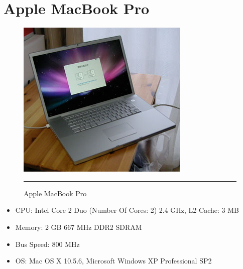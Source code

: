 \chapter{Apple MacBook Pro}
\label{AppendixB}

\begin{figure}[htbp]
  \centering
    \includegraphics{./Primitives/macbookpro.jpg}
    \rule{35em}{0.5pt}
  \caption[Apple MacBook Pro]{Apple MacBook Pro}
\end{figure}

\begin{itemize}
	\item CPU: Intel Core 2 Duo (Number Of Cores: 2) 2.4 GHz, L2 Cache: 3 MB
	\item Memory: 2 GB 667 MHz DDR2 SDRAM
	\item Bus Speed: 800 MHz
	\item OS: Mac OS X 10.5.6, Microsoft Windows XP Professional SP2
\end{itemize}
